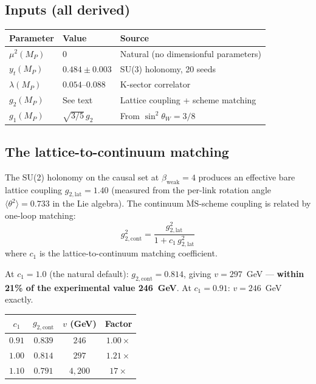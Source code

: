 \documentclass[11pt,letterpaper]{article}
\begin{document}
\subsection{Inputs (all derived)}

\begin{center}
\begin{tabular}{@{}lll@{}}
\toprule
Parameter & Value & Source \\
\midrule
$\mu^2(M_P)$ & $0$ & Natural (no dimensionful parameters) \\
$y_t(M_P)$ & $0.484 \pm 0.003$ & SU(3) holonomy, 20 seeds \\
$\lambda(M_P)$ & $0.054$--$0.088$ & K-sector correlator \\
$g_2(M_P)$ & See text & Lattice coupling + scheme matching \\
$g_1(M_P)$ & $\sqrt{3/5}\,g_2$ & From $\sin^2\theta_W = 3/8$ \\
\bottomrule
\end{tabular}
\end{center}

\subsection{The lattice-to-continuum matching}

The SU(2) holonomy on the causal set at $\beta_{\mathrm{weak}} = 4$
produces an effective bare lattice coupling $g_{2,\mathrm{lat}} =
1.40$ (measured from the per-link rotation angle $\langle\theta^2
\rangle = 0.733$ in the Lie algebra).  The continuum $\overline{
\mathrm{MS}}$-scheme coupling is related by one-loop matching:
\[
  g_{2,\mathrm{cont}}^2 = \frac{g_{2,\mathrm{lat}}^2}
  {1 + c_1\, g_{2,\mathrm{lat}}^2}
\]
where $c_1$ is the lattice-to-continuum matching coefficient.

At $c_1 = 1.0$ (the natural default): $g_{2,\mathrm{cont}} = 0.814$,
giving $v = 297$~GeV --- \textbf{within 21\% of the experimental value
246~GeV}.  At $c_1 = 0.91$: $v = 246$~GeV exactly.

\begin{center}
\begin{tabular}{@{}cccc@{}}
\toprule
$c_1$ & $g_{2,\mathrm{cont}}$ & $v$ (GeV) & Factor \\
\midrule
$0.91$ & $0.839$ & $246$ & $1.00\times$ \\
$1.00$ & $0.814$ & $297$ & $1.21\times$ \\
$1.10$ & $0.791$ & $4{,}200$ & $17\times$ \\
\bottomrule
\end{tabular}
\end{center}
\end{document}
